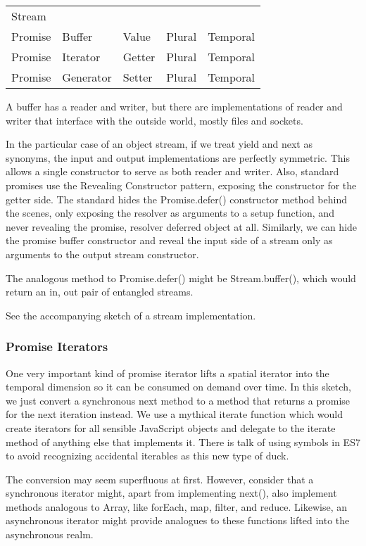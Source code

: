 \begin{tabular}{|l|l|l|l|l|}

Stream			& & & & \\
Promise & Buffer&	Value&	Plural&	Temporal\\
Promise &Iterator&	Getter&	Plural&	Temporal\\
Promise &Generator&	Setter&	Plural&	Temporal\\
\end{tabular}

A buffer has a reader and writer, but there are implementations of reader and writer that interface with the outside world, mostly files and sockets.

In the particular case of an object stream, if we treat yield and next as synonyms, the input and output implementations are perfectly symmetric. This allows a single constructor to serve as both reader and writer. Also, standard promises use the Revealing Constructor pattern, exposing the constructor for the getter side. The standard hides the Promise.defer() constructor method behind the scenes, only exposing the resolver as arguments to a setup function, and never revealing the {promise, resolver} deferred object at all. Similarly, we can hide the promise buffer constructor and reveal the input side of a stream only as arguments to the output stream constructor.

The analogous method to Promise.defer() might be Stream.buffer(), which would return an {in, out} pair of entangled streams.

See the accompanying sketch of a stream implementation.

\subsubsection{Promise Iterators}

One very important kind of promise iterator lifts a spatial iterator into the temporal dimension so it can be consumed on demand over time. In this sketch, we just convert a synchronous next method to a method that returns a promise for the next iteration instead. We use a mythical iterate function which would create iterators for all sensible JavaScript objects and delegate to the iterate method of anything else that implements it. There is talk of using symbols in ES7 to avoid recognizing accidental iterables as this new type of duck.

The conversion may seem superfluous at first. However, consider that a synchronous iterator might, apart from implementing next(), also implement methods analogous to Array, like forEach, map, filter, and reduce. Likewise, an asynchronous iterator might provide analogues to these functions lifted into the asynchronous realm.

